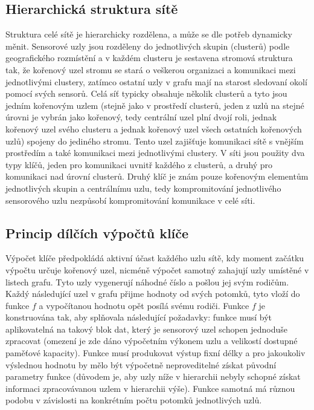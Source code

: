 \documentclass[11pt,final,twoside]{fithesis2}
\begin{document}
\subsection{Hierarchická struktura sítě}
Struktura celé sítě je hierarchicky rozdělena, a může se dle potřeb dynamicky měnit. Sensorové uzly jsou rozděleny do jednotlivých skupin (clusterů) podle geografického rozmístění a 
v každém clusteru je sestavena stromová struktura tak, že kořenový uzel stromu se stará o veškerou organizaci a komunikaci mezi jednotlivými clustery, zatímco ostatní uzly v grafu 
mají na starost sledovaní okolí pomocí svých sensorů. Celá síť typicky obsahuje několik clusterů a tyto jsou jedním kořenovým uzlem (stejně jako v prostředí clusterů, jeden z uzlů na stejné
úrovni je vybrán jako kořenový, tedy centrální uzel plní dvojí roli, jednak kořenový uzel svého clusteru a jednak kořenový uzel všech ostatních kořenových uzlů)
spojeny do jediného stromu. Tento uzel zajišťuje komunikaci sítě s vnějším prostředím a také komunikaci mezi jednotlivými clustery. V síti jsou použity dva typy klíčů, jeden pro 
komunikaci uvnitř každého z clusterů, a druhý pro komunikaci nad úrovní clusterů. Druhý klíč je znám pouze kořenovým elementům jednotlivých skupin a centrálnímu uzlu, tedy kompromitování 
jednotlivého sensorového uzlu nezpůsobí kompromitování komunikace v celé síti. 

\subsection{Princip dílčích výpočtů klíče}
Výpočet klíče předpokládá aktivní účast každého uzlu sítě, kdy moment začátku výpočtu určuje kořenový uzel, nicméně výpočet samotný zahajují uzly umístěné v listech grafu. 
Tyto uzly vygenerují náhodné číslo a pošlou jej svým rodičům. Každý následující uzel v grafu přijme hodnoty od svých potomků, tyto vloží do funkce $f$ a vypočítanou hodnotu opět 
posílá svému rodiči. Funkce $f$ je konstruována tak, aby splňovala následující požadavky: funkce musí být aplikovatelná na takový blok dat, který je sensorový uzel schopen jednoduše zpracovat
(omezení je zde dáno výpočetním výkonem uzlu a velikostí dostupné paměťové kapacity). Funkce musí produkovat výstup fixní délky a pro jakoukoliv výslednou hodnotu by mělo být výpočetně neproveditelné 
získat původní parametry funkce (důvodem je, aby uzly níže v hierarchii nebyly schopné získat informaci zpracovávanou uzlem v hierarchii výše).
Funkce samotná má různou podobu v závislosti na konkrétním počtu potomků jednotlivých uzlů. 
\end{document}
